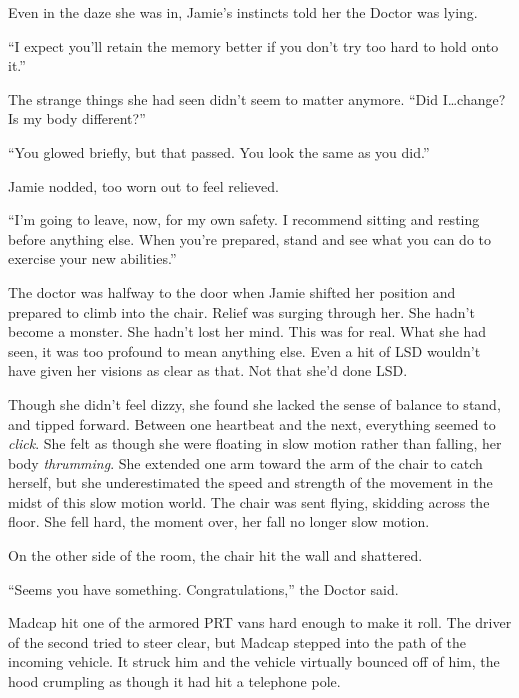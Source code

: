 Even in the daze she was in, Jamie's instincts told her the Doctor was lying.



``I expect you'll retain the memory better if you don't try too hard to hold onto it.''



The strange things she had seen didn't seem to matter anymore.  ``Did I\ldots change?  Is my body different?''



``You glowed briefly, but that passed.  You look the same as you did.''



Jamie nodded, too worn out to feel relieved.



``I'm going to leave, now, for my own safety.  I recommend sitting and resting before anything else.  When you're prepared, stand and see what you can do to exercise your new abilities.''



The doctor was halfway to the door when Jamie shifted her position and prepared to climb into the chair.  Relief was surging through her.  She hadn't become a monster.  She hadn't lost her mind.  This was for real.  What she had seen, it was too profound to mean anything else.  Even a hit of LSD wouldn't have given her visions as clear as that.  Not that she'd done LSD.



Though she didn't feel dizzy, she found she lacked the sense of balance to stand, and tipped forward.  Between one heartbeat and the next, everything seemed to \emph{click}.  She felt as though she were floating in slow motion rather than falling, her body \emph{thrumming}.  She extended one arm toward the arm of the chair to catch herself, but she underestimated the speed and strength of the movement in the midst of this slow motion world.  The chair was sent flying, skidding across the floor.  She fell hard, the moment over, her fall no longer slow motion.



On the other side of the room, the chair hit the wall and shattered.



``Seems you have something.  Congratulations,'' the Doctor said.



\blacksquare



Madcap hit one of the armored PRT vans hard enough to make it roll.  The driver of the second tried to steer clear, but Madcap stepped into the path of the incoming vehicle.  It struck him and the vehicle virtually bounced off of him, the hood crumpling as though it had hit a telephone pole.



